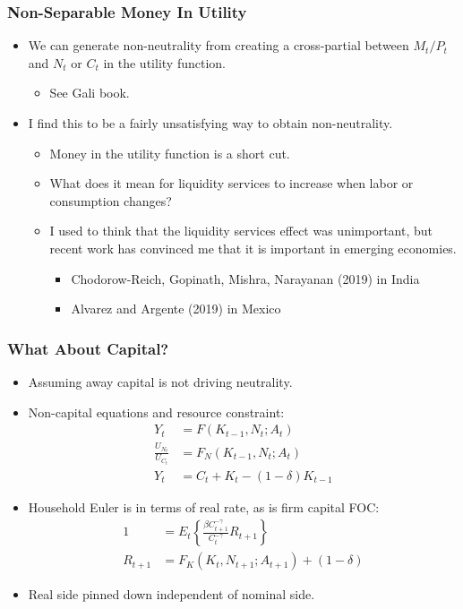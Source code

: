 \documentclass[english,xcolor=svgnames]{beamer}
\begin{document}
\begin{frame}
\frametitle{Non-Separable Money In Utility
}
\begin{itemize}
	\item We can generate non-neutrality from creating a cross-partial between $M_t/P_t$ and $N_t$ or $C_t$ in the utility function.
	\begin{itemize}
		\item See Gali book.
	\end{itemize}
	\item I find this to be a fairly unsatisfying way to obtain
non-neutrality.
	\begin{itemize}
		\item Money in the utility function is a short cut.
		\item What does it mean for liquidity services to increase when labor or consumption changes?
		\item I used to think that the liquidity services effect was unimportant, but recent work has convinced me that it is important in emerging economies.
		\begin{itemize}
			\item Chodorow-Reich, Gopinath, Mishra, Narayanan (2019) in India
			\item Alvarez and Argente (2019) in Mexico
		\end{itemize}	
	\end{itemize}
\end{itemize}
\end{frame}



\begin{frame}
\frametitle{What About Capital?
}
\begin{itemize}
	\item Assuming away capital is not driving neutrality.
	\item Non-capital equations and resource constraint:
	\begin{align*}
	Y_t&=F(K_{t-1},N_t;A_t) \\
	\frac{U_{N_t}}{U_{C_t}}&=F_N(K_{t-1},N_t;A_t) \\
	Y_t&=C_{t}+K_t-(1-\delta)K_{t-1} 
	\end{align*}
	\item Household Euler is in terms of real rate, as is firm capital FOC:
	\begin{align*}
		1&=E_t\left\{\frac{\beta C_{t+1}^{-\gamma}}{C_{t}^{-\gamma}}R_{t+1}\right\} \\
		R_{t+1}&=F_K(K_{t},N_{t+1};A_{t+1})+(1-\delta)
	\end{align*}
	\item Real side pinned down independent of nominal side.
\end{itemize}
\end{frame}
\end{document}
